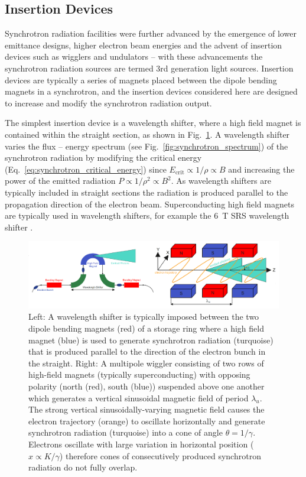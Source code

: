 \documentclass[../main.tex]{subfiles}
\begin{document}
\subsection{Insertion Devices}

Synchrotron radiation facilities were further advanced by the emergence of lower emittance designs, higher electron beam energies and the advent of insertion devices such as wigglers and undulators -- with these advancements the synchrotron radiation sources are termed 3rd generation light sources. Insertion devices are typically a series of magnets placed between the dipole bending magnets in a synchrotron, and the insertion devices considered here are designed to increase and modify the synchrotron radiation output. 

The simplest insertion device is a wavelength shifter, where a high field magnet is contained within the straight section, as shown in Fig.~\ref{fig:wavelength_shifter_wiggler}. A wavelength shifter varies the flux -- energy spectrum (see Fig.~\ref{fig:synchrotron_spectrum}) of the synchrotron radiation by modifying the critical energy (Eq.~\ref{eq:synchrotron_critical_energy}) since $E_{\mathrm{crit}} \propto 1/\rho \propto B$ and increasing the power of the emitted radiation $P \propto 1/\rho^{2} \propto B^{2}$. As wavelength shifters are typically included in straight sections the radiation is produced parallel to the propagation direction of the electron beam. Superconducting high field magnets are typically used in wavelength shifters, for example the 6~\si{\tesla} SRS wavelength shifter \cite{poole1989second}.   
\begin{figure}[!h]
\centering
\includegraphics[width=\textwidth]{Figures/Introduction/wavelength_shifter_wiggler.pdf}
\caption{Left: A wavelength shifter is typically imposed between the two dipole bending magnets (red) of a storage ring where a high field magnet (blue) is used to generate synchrotron radiation (turquoise) that is produced parallel to the direction of the electron bunch in the straight. Right: A multipole wiggler consisting of two rows of high-field magnets (typically superconducting) with opposing polarity (north (red), south (blue)) suspended above one another which generates a vertical sinusoidal magnetic field of period $\lambda_{u}$. The strong vertical sinusoidally-varying magnetic field causes the electron trajectory (orange) to oscillate horizontally and generate synchrotron radiation (turquoise) into a cone of angle $\theta = 1/\gamma$. Electrons oscillate with large variation in horizontal position ($x \propto K/\gamma$) therefore cones of consecutively produced synchrotron radiation do not fully overlap. }
\label{fig:wavelength_shifter_wiggler}
\end{figure}
\end{document}
